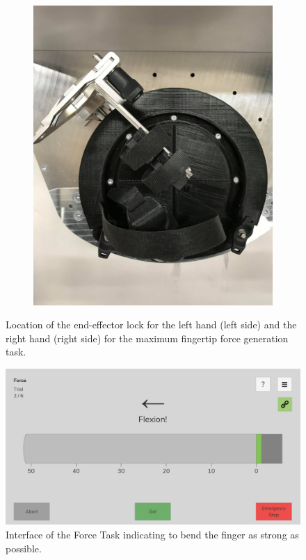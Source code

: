 \documentclass[10pt,oneside,a4paper]{article}
\begin{document}
\begin{figure}[h!]
\begin{subfigure}[b]{0.48\textwidth}
	\includegraphics[width=\textwidth]{images/Hardware/ForceTask2.jpg}
\end{subfigure}
\caption{Location of the end-effector lock for the left hand (left side) and the right hand (right side) for the maximum fingertip force generation task.}
\label{fig:EndeffoctorLock}
\end{figure}

\begin{figure}[h!]
\begin{center}
\includegraphics[width=\columnwidth]{images/Assessments/Force.png}
\caption{Interface of the Force Task indicating to bend the finger as strong as possible.}
\label{fig:ForceTask}
\end{center}
\end{figure}
\end{document}
